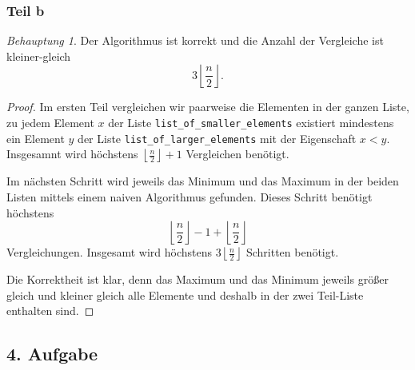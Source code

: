 \documentclass[draft,a5paper]{article}
\theoremstyle{remark}
\newtheorem*{Behauptung}{Behauptung}
\begin{document}
\subsubsection{Teil b}
\begin{Behauptung}
  Der Algorithmus ist korrekt und die
  Anzahl der Vergleiche ist kleiner-gleich
  \[3 \left \lfloor \frac{n}{2} \right \rfloor.\]
\end{Behauptung}
\begin{proof}
    Im ersten Teil vergleichen wir paarweise die Elementen
  in der ganzen Liste, zu jedem Element \(x\) der Liste
  \texttt{list\_of\_smaller\_elements} existiert mindestens
  ein Element \(y\) der Liste
  \texttt{list\_of\_larger\_elements} mit der Eigenschaft
  \(x < y\).  Insgesamnt wird höchstens
  \(\left \lfloor \frac{n}{2} \right \rfloor + 1\)
  Vergleichen benötigt.

  Im nächsten Schritt wird jeweils das Minimum und das
  Maximum in der beiden Listen mittels einem naiven
  Algorithmus gefunden.  Dieses Schritt benötigt
  höchstens
  \[\left \lfloor \frac{n}{2} \right \rfloor - 1 + \left
    \lfloor \frac{n}{2} \right \rfloor\]
  Vergleichungen.
  Insgesamt wird höchstens
  \(3 \left \lfloor \frac{n}{2} \right \rfloor\) Schritten
  benötigt.

  Die Korrektheit ist klar, denn das Maximum und das
  Minimum jeweils größer gleich und kleiner gleich alle
  Elemente und deshalb in der zwei Teil-Liste enthalten sind.
\end{proof}
\subsection{4. Aufgabe}
\end{document}
